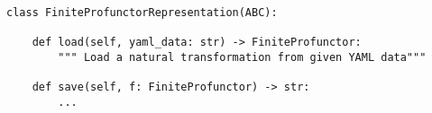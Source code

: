 \begin{verbatim}
class FiniteProfunctorRepresentation(ABC):

    def load(self, yaml_data: str) -> FiniteProfunctor:
        """ Load a natural transformation from given YAML data"""

    def save(self, f: FiniteProfunctor) -> str:
        ...
\end{verbatim}